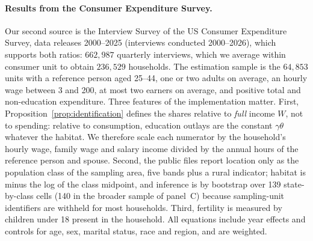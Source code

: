 \documentclass[11pt]{article}
\begin{document}
\paragraph{Results from the Consumer Expenditure Survey.}
Our second source is the Interview Survey of the US Consumer Expenditure Survey, data releases 2000--2025 (interviews conducted 2000--2026), which
supports both ratios: $662{,}987$ quarterly interviews, which we average within consumer
unit to obtain $236{,}529$ households. The estimation sample is the $64{,}853$ units with a
reference person aged 25--44, one or two adults on average, an hourly wage between 3 and 200, at most
two earners on average, and positive total and non-education expenditure. Three features of the
implementation matter. First, Proposition~\ref{prop:identification} defines the shares relative to
\emph{full} income $W$, not to spending: relative to consumption, education outlays are the
constant $\gamma\theta$ whatever the habitat. We therefore scale each numerator by the household's
hourly wage, family wage and salary income divided by the annual hours of the reference person and
spouse. Second, the public files report location only as the population class of the sampling
area, five bands plus a rural indicator; habitat is minus the log of the class midpoint, and
inference is by bootstrap over 139 state-by-class cells (140 in the broader sample of panel~C) because sampling-unit identifiers are
withheld for most households. Third, fertility is measured by children under 18 present in the
household. All equations include year effects and controls for age, sex, marital status, race and
region, and are weighted.
\end{document}
